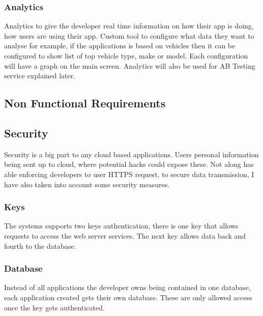 \subsubsection{Analytics}
Analytics to give the developer real time information on how their app is doing, how users are using their app. Custom tool to configure what data they want to analyse for example, if the applications is based on vehicles then it can be configured to show list of top vehicle type, make or model. Each configuration will have a graph on the main screen. Analytics will also be used for AB Testing service explained later.

\subsection{Non Functional Requirements}

\subsection{Security}
Security is a big part to any cloud based applications. Users personal information being sent up to cloud, where potential hacks could expose these. Not along has able enforcing developers to user HTTPS request, to secure data transmission, I have also taken into account some security measures. 

\subsubsection{Keys}
The systems supports two keys authentication, there is one key that allows requests to access the web server services. The next key allows data back and fourth to the database.

\subsubsection{Database}
Instead of all applications the developer owns being contained in one database, each application created gets their own database. These are only allowed access once the key gets authenticated.







